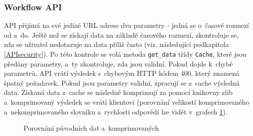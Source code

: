 \subsubsection*{Workflow API}

API přijímá na své jediné URL adrese dva parametry - jedná se o~časové rozmezí od a~do. Ještě než se získají data na základě časového rozmezí, zkontroluje se, zda se uživatel nedotazuje na data příliš často (viz. následující podkapitola \ref{APIsecurity}). Po této kontrole se volá metoda \lstinline{get_data} třídy \lstinline{Cache}, které jsou předány parametry, a~ty zkontroluje, zda jsou validní. Pokud dojde k~chybě parametrů, API vrátí výsledek s~chybovým HTTP kódem 400, který znamená špatný požadavek. Pokud jsou parametry validní, zpracují se z~cache výsledná data. Získaná data z~cache se následně komprimují za pomocí knihovny zlib a~komprimovaný výsledek se vrátí klientovi (porovnání velikostí komprimovaného a~nekomprimovaného slovníku a~rychlosti odpovědí lze vidět v~grafech \ref{fig:Compress}).

\begin{figure}[h]
\centering
{}\hfill
{}
\caption{Porovnání původních dat a~komprimovaných}
\label{fig:Compress}
\end{figure}

